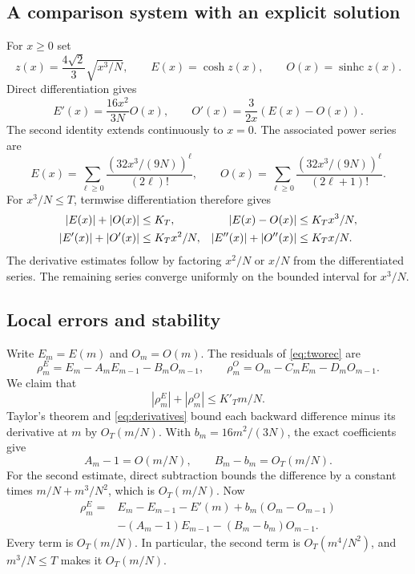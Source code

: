 \documentclass[11pt]{article}
\theoremstyle{definition}
\theoremstyle{remark}
\newcommand{\1}{\mathbf 1}
\newcommand{\shc}{\operatorname{sinhc}}
\begin{document}
\subsection{A comparison system with an explicit solution}

For $x\ge0$ set
\[
z(x)=\frac{4\sqrt2}{3}\sqrt{x^3/N},\qquad
E(x)=\cosh z(x),\qquad O(x)=\shc z(x).
\]
Direct differentiation gives
\begin{equation}\label{eq:ode}
E'(x)=\frac{16x^2}{3N}O(x),\qquad
O'(x)=\frac3{2x}(E(x)-O(x)).
\end{equation}
The second identity extends continuously to $x=0$. The associated power series are
\[
E(x)=\sum_{\ell\ge0}\frac{(32x^3/(9N))^\ell}{(2\ell)!},\qquad
O(x)=\sum_{\ell\ge0}\frac{(32x^3/(9N))^\ell}{(2\ell+1)!}.
\]
For $x^3/N\le T$, termwise differentiation therefore gives
\begin{align}
|E(x)|+|O(x)|&\le K_T,&
|E(x)-O(x)|&\le K_Tx^3/N,\notag\\
|E'(x)|+|O'(x)|&\le K_Tx^2/N,&
|E''(x)|+|O''(x)|&\le K_Tx/N.\label{eq:derivatives}
\end{align}
The derivative estimates follow by factoring $x^2/N$ or $x/N$ from the differentiated series. The remaining series converge uniformly on the bounded interval for $x^3/N$.

\subsection{Local errors and stability}

Write $E_m=E(m)$ and $O_m=O(m)$. The residuals of \eqref{eq:tworec} are
\[
\rho_m^E=E_m-A_mE_{m-1}-B_mO_{m-1},\qquad
\rho_m^O=O_m-C_mE_m-D_mO_{m-1}.
\]
We claim that
\begin{equation}\label{eq:residual}
|\rho_m^E|+|\rho_m^O|\le K'_Tm/N.
\end{equation}
Taylor's theorem and \eqref{eq:derivatives} bound each backward difference minus its derivative at $m$ by $O_T(m/N)$. With $b_m=16m^2/(3N)$, the exact coefficients give
\[
A_m-1=O(m/N),\qquad B_m-b_m=O_T(m/N).
\]
For the second estimate, direct subtraction bounds the difference by a constant times $m/N+m^3/N^2$, which is $O_T(m/N)$. Now
\begin{align*}
\rho_m^E={}&E_m-E_{m-1}-E'(m)+b_m(O_m-O_{m-1})\\
&-(A_m-1)E_{m-1}-(B_m-b_m)O_{m-1}.
\end{align*}
Every term is $O_T(m/N)$. In particular, the second term is $O_T(m^4/N^2)$, and $m^3/N\le T$ makes it $O_T(m/N)$.
\end{document}
